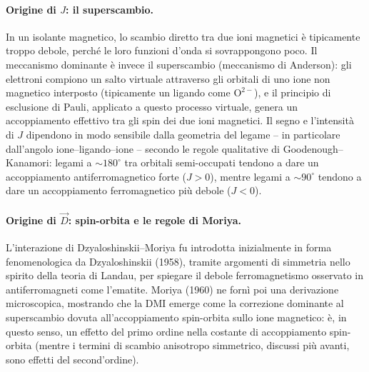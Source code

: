 \documentclass[11pt,a4paper]{article}
\begin{document}
\paragraph{Origine di $J$: il superscambio.} In un isolante magnetico, lo scambio
diretto tra due ioni magnetici \`e tipicamente troppo debole, perch\'e le loro
funzioni d'onda si sovrappongono poco. Il meccanismo dominante \`e invece il
superscambio (meccanismo di Anderson): gli elettroni compiono un salto virtuale
attraverso gli orbitali di uno ione non magnetico interposto (tipicamente un ligando
come $\mathrm{O}^{2-}$), e il principio di esclusione di Pauli, applicato a questo
processo virtuale, genera un accoppiamento effettivo tra gli spin dei due ioni
magnetici. Il segno e l'intensit\`a di $J$ dipendono in modo sensibile dalla geometria
del legame -- in particolare dall'angolo ione--ligando--ione -- secondo le regole
qualitative di Goodenough--Kanamori: legami a $\sim180^\circ$ tra orbitali
semi-occupati tendono a dare un accoppiamento antiferromagnetico forte ($J>0$),
mentre legami a $\sim90^\circ$ tendono a dare un accoppiamento ferromagnetico pi\`u
debole ($J<0$).

\paragraph{Origine di $\vec D$: spin-orbita e le regole di Moriya.} L'interazione di
Dzyaloshinskii--Moriya fu introdotta inizialmente in forma fenomenologica da
Dzyaloshinskii (1958), tramite argomenti di simmetria nello spirito della teoria di
Landau, per spiegare il debole ferromagnetismo osservato in antiferromagneti come
l'ematite. Moriya (1960) ne fornì poi una derivazione microscopica, mostrando che la
DMI emerge come la correzione dominante al superscambio dovuta all'accoppiamento
spin-orbita sullo ione magnetico: \`e, in questo senso, un effetto del primo ordine
nella costante di accoppiamento spin-orbita (mentre i termini di scambio anisotropo
simmetrico, discussi pi\`u avanti, sono effetti del second'ordine).
\end{document}
